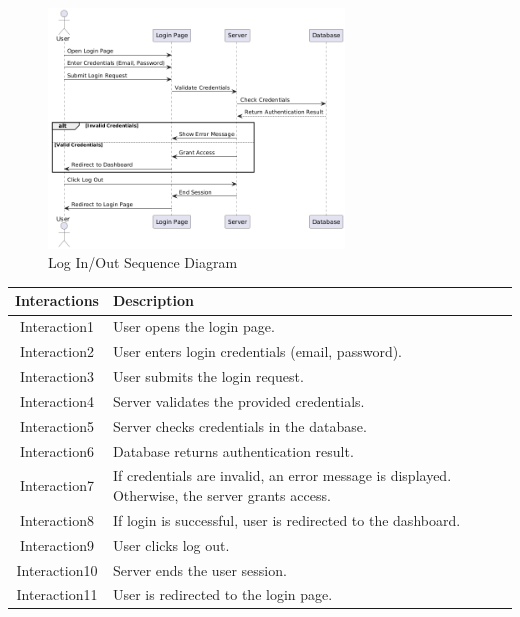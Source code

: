 \begin{figure}[h]
    \centering
    \includegraphics[width=0.7\textwidth]{images/login_out.png} %
    \caption{Log In/Out Sequence Diagram}
    \label{fig:example}
\end{figure}


\begin{longtable}{|c|p{10cm}|}
    \hline
    \textbf{Interactions} & \textbf{Description} \\
    \hline
    Interaction1 & User opens the login page. \\
    \hline
    Interaction2 & User enters login credentials (email, password). \\
    \hline
    Interaction3 & User submits the login request. \\
    \hline
    Interaction4 & Server validates the provided credentials. \\
    \hline
    Interaction5 & Server checks credentials in the database. \\
    \hline
    Interaction6 & Database returns authentication result. \\
    \hline
    Interaction7 & If credentials are invalid, an error message is displayed. Otherwise, the server grants access. \\
    \hline
    Interaction8 & If login is successful, user is redirected to the dashboard. \\
    \hline
    Interaction9 & User clicks log out. \\
    \hline
    Interaction10 & Server ends the user session. \\
    \hline
    Interaction11 & User is redirected to the login page. \\
    \hline
\end{longtable}
\newpage

